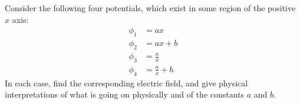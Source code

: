 Consider the following four potentials, which exist in some region of the positive $x$ axis:
\begin{align*}
  \phi_1 &= ax \\
  \phi_2 &= ax+b \\
  \phi_3 &= \frac{a}{x} \\
  \phi_4 &= \frac{a}{x}+b.
\end{align*}
In each case, find the corresponding electric field, and give physical
interpretations of what is going on physically and of the constants
$a$ and $b$.

